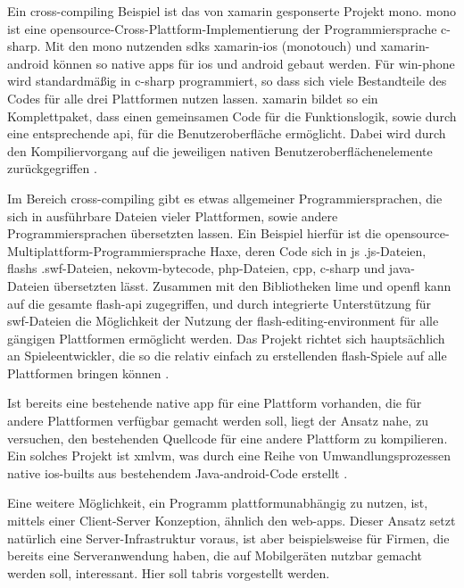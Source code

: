 Ein \gls{cross-compiling} Beispiel ist das von \gls{xamarin} gesponserte Projekt \gls{mono}. \gls{mono} ist eine \gls{opensource}-Cross-Plattform-Implementierung der Programmiersprache \gls{c-sharp}. Mit den \gls{mono} nutzenden \glspl{sdk} \gls{xamarin-ios} (\gls{monotouch}) und \gls{xamarin-android} können so native \glspl{app} für \gls{ios} und \gls{android} gebaut werden. Für \gls{win-phone} wird standardmäßig in \gls{c-sharp} programmiert, so dass sich viele Bestandteile des Codes für alle drei Plattformen nutzen lassen.
\gls{xamarin} bildet so ein Komplettpaket, dass einen gemeinsamen Code für die Funktionslogik, sowie durch eine entsprechende \gls{api}, für die Benutzeroberfläche ermöglicht. Dabei wird durch den Kompiliervorgang auf die jeweiligen nativen Benutzeroberflächenelemente zurückgegriffen \cite{Mono_Projekt}.

Im Bereich \gls{cross-compiling} gibt es etwas allgemeiner Programmiersprachen, die sich in ausführbare Dateien vieler Plattformen, sowie andere Programmiersprachen übersetzten lassen. Ein Beispiel hierfür ist die \gls{opensource}-Multiplattform-Programmiersprache Haxe, deren Code sich in \gls{js} .js-Dateien, \glspl{flash} .swf-Dateien, \gls{nekovm}-\gls{bytecode}, \gls{php}-Dateien, \gls{cpp}, \gls{c-sharp} und \gls{java}-Dateien übersetzten lässt. Zusammen mit den Bibliotheken \gls{lime} und \gls{openfl} kann auf die gesamte \gls{flash}-\gls{api} zugegriffen, und durch integrierte Unterstützung für \gls{swf}-Dateien die Möglichkeit der Nutzung der \gls{flash-editing-environment} für alle gängigen Plattformen ermöglicht werden. Das Projekt richtet sich hauptsächlich an Spieleentwickler, die so die relativ einfach zu erstellenden \gls{flash}-Spiele auf alle Plattformen bringen können \cite{Haxe, OpenFL}.

Ist bereits eine bestehende native \gls{app} für eine Plattform vorhanden, die für andere Plattformen verfügbar gemacht werden soll, liegt der Ansatz nahe, zu versuchen, den bestehenden Quellcode für eine andere Plattform zu kompilieren. Ein solches Projekt ist \gls{xmlvm}, was durch eine Reihe von Umwandlungsprozessen native \gls{ios}-\glspl{built} aus bestehendem Java-\gls{android}-Code erstellt \cite{XMLVM}.

Eine weitere Möglichkeit, ein Programm plattformunabhängig zu nutzen, ist, mittels einer Client-Server Konzeption, ähnlich den \glspl{web-app}. Dieser Ansatz setzt natürlich eine Server-Infrastruktur voraus, ist aber beispielsweise für Firmen, die bereits eine Serveranwendung haben, die auf Mobilgeräten nutzbar gemacht werden soll, interessant.
Hier soll \gls{tabris} vorgestellt werden.

